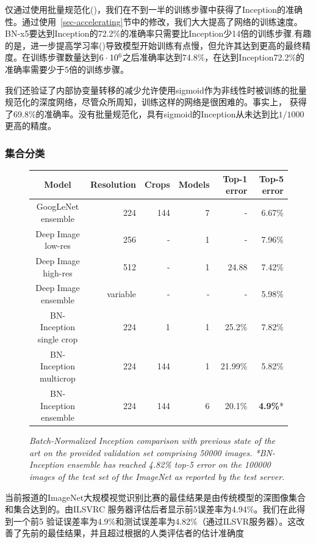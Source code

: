 \documentclass[twocolumn]{article}
\begin{document}
仅通过使用批量规范化()，我们在不到一半的训练步骤中获得了Inception的准确性。通过使用~\ref{sec-accelerating}节中的修改，我们大大提高了网络的训练速度。BN-x5要达到Inception的72.2\%的准确率只需要比Inception少14倍的训练步骤.有趣的是，进一步提高学习率()导致模型开始训练有点慢，但允许其达到更高的最终精度。在训练步骤数量达到$6\cdot 10^6$之后准确率达到74.8\%，在达到Inception72.2\%的准确率需要少于5倍的训练步骤。

我们还验证了内部协变量转移的减少允许使用sigmoid作为非线性时被训练的批量规范化的深度网络，尽管众所周知，训练这样的网络是很困难的。事实上， 获得了69.8\%的准确率。没有批量规范化，具有sigmoid的Inception从未达到比$1/1000$更高的精度。

\subsubsection{集合分类}

\begin{figure}[t!]
\centering
\begin{tabular}{c | r  r  r  r  r }
\hline
Model & Resolution & Crops & Models & Top-1 error & Top-5 error \\ 
\hline
{GoogLeNet ensemble} & 224 & 144 & 7 & - & 6.67\% \\
{Deep Image low-res} & 256 & - & 1 & - & 7.96\% \\
{Deep Image high-res} & 512 & - & 1 & 24.88 & 7.42\% \\
{Deep Image ensemble} & variable & - & - & - & 5.98\% \\
{BN-Inception single crop} & 224 & 1 & 1 & 25.2\% & 7.82\% \\
{BN-Inception multicrop} & 224 & 144 & 1 & 21.99\% & 5.82\% \\
{BN-Inception ensemble} & 224 & 144 & 6 & 20.1\% & {\bf 4.9\%}* \\
\hline
\end{tabular}
\caption{\em Batch-Normalized Inception comparison with previous state of the art on the provided validation set comprising 50000 images.
  *BN-Inception ensemble has reached 4.82\% top-5 error on the 100000 images of the test set of the ImageNet as reported by the test server. }
\label{fig-classification-comparison}
\end{figure}

当前报道的ImageNet大规模视觉识别比赛的最佳结果是由传统模型的深图像集合\cite{deepimage}和\cite{msr}集合达到的。由ILSVRC 服务器评估后者显示前5误差率为4.94\%。我们在此得到一个前5 验证误差率为4.9\%和测试误差率为4.82\%（通过ILSVR服务器）。这改善了先前的最佳结果，并且超过根据的人类评估者的估计准确度\cite{imagenet}
\end{document}
